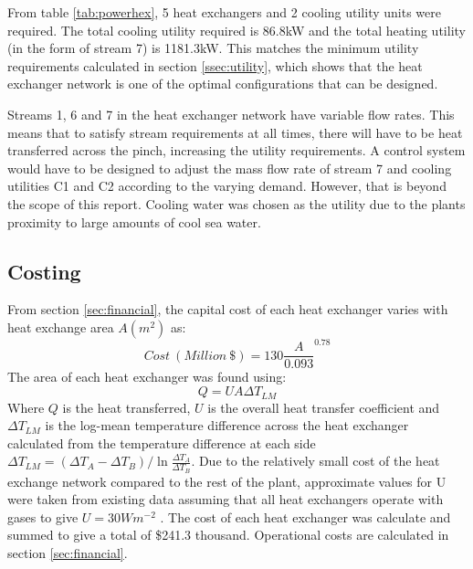 From table \ref{tab:powerhex}, 5 heat exchangers and 2 cooling utility units were required. The total cooling utility required is 86.8kW and the total heating utility (in the form of stream 7) is 1181.3kW. This matches the minimum utility requirements calculated in section \ref{ssec:utility}, which shows that the heat exchanger network is one of the optimal configurations that can be designed.

Streams 1, 6 and 7 in the heat exchanger network have variable flow rates. This means that to satisfy stream requirements at all times, there will have to be heat transferred across the pinch, increasing the utility requirements. A control system would have to be designed to adjust the mass flow rate of stream 7 and cooling utilities C1 and C2 according to the varying demand. However, that is beyond the scope of this report. Cooling water was chosen as the utility due to the plants proximity to large amounts of cool sea water. %

\subsection{Costing}
From section \ref{sec:financial}, the capital cost of each heat exchanger varies with heat exchange area $A (m^2)$ as:
\begin{equation} %
Cost \ (Million\ \$) = 130 \frac{A}{0.093}^{0.78}
\end{equation}
The area of each heat exchanger was found using: 
\begin{equation}Q = UA\Delta T_{LM} \end{equation}
Where $Q$ is the heat transferred, $U$ is the overall heat transfer coefficient and $\Delta T_{LM}$ is the log-mean temperature difference across the heat exchanger calculated from the temperature difference at each side $\Delta T_{LM} = (\Delta T_A - \Delta T_B)/\ln{\frac{\Delta T_A}{\Delta T_B}}$. Due to the relatively small cost of the heat exchange network compared to the rest of the plant, approximate values for U were taken from existing data assuming that all heat exchangers operate with gases to give $U=30Wm^{-2}$ \cite{hexcoeff}. The cost of each heat exchanger was calculate and summed to give a total of \$241.3 thousand. Operational costs are calculated in section \ref{sec:financial}. %



%